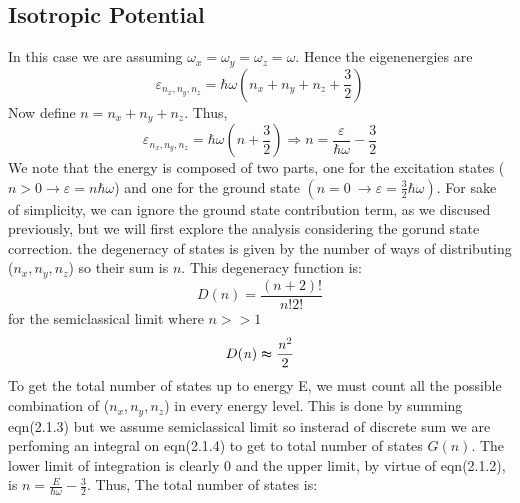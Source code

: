 \documentclass{article}
\numberwithin{equation}{section}
\numberwithin{equation}{subsection}
\begin{document}
\subsection{Isotropic Potential}
In this case we are assuming $\omega_{\mathit{x}} = \omega_{\mathit{y}} = \omega_{\mathit{z}} = \omega$. Hence the eigenenergies are
\begin{equation}
    \varepsilon_{\mathit{n}_{\mathit{x}},\mathit{n}_{\mathit{y}},\mathit{n}_{\mathit{z}}} = \hbar\omega\left(\mathit{n}_{\mathit{x}}+\mathit{n}_{\mathit{y}}+\mathit{n}_{\mathit{z}}+\frac{3}{2}\right)
\end{equation}
Now define $ \mathit{n} = \mathit{n}_{\mathit{x}}+\mathit{n}_{\mathit{y}}+\mathit{n}_{\mathit{z}}$. Thus,
\begin{equation}
    \varepsilon_{\mathit{n}_{\mathit{x}},\mathit{n}_{\mathit{y}},\mathit{n}_{\mathit{z}}} = \hbar\omega\left(\mathit{n}+\frac{3}{2}\right) \Longrightarrow \mathit{n} = \frac{\varepsilon}{\hbar\omega}-\frac{3}{2}
\end{equation}
We note that the energy is composed of two parts, one for the excitation states ($\mathit{n} > 0 \rightarrow \varepsilon = \mathit{n}\hbar\omega$) and one for the ground state $\left(\mathit{n} = 0 \ \rightarrow \varepsilon = \frac{3}{2}\hbar\omega\right)$. For sake of simplicity, we can ignore the ground state contribution term, as we discused previously, but we will first explore the analysis considering the gorund state correction.
the degeneracy of states is given by the number of ways of distributing ($\mathit{n}_{\mathit{x}}, \mathit{n}_{\mathit{y}}, \mathit{n}_{\mathit{z}}$) so their sum is $\mathit{n}$. This degeneracy function is:
\begin{equation}
    D(\mathit{n}) = \frac{(\mathit{n}+2)!}{\mathit{n}!2!}
\end{equation}
for the semiclassical limit where $\mathit{n}>>1$
\begin{equation}
    D(\mathit{n}) \thickapprox  \frac{\mathit{n}^2}{2}
\end{equation}
To get the total number of states up to energy E, we must count all the possible combination of ($\mathit{n}_{\mathit{x}}, \mathit{n}_{\mathit{y}}, \mathit{n}_{\mathit{z}}$) in every energy level. This is done by summing eqn(2.1.3) but we assume semiclassical limit so insterad of discrete sum we are perfoming an integral on eqn(2.1.4) to get to total number of states $G(n)$. The lower limit of integration is clearly 0 and the upper limit, by virtue of eqn(2.1.2), is $\mathit{n} = \frac{E}{\hbar\omega}-\frac{3}{2} $. Thus, The total number of states is:
\end{document}
